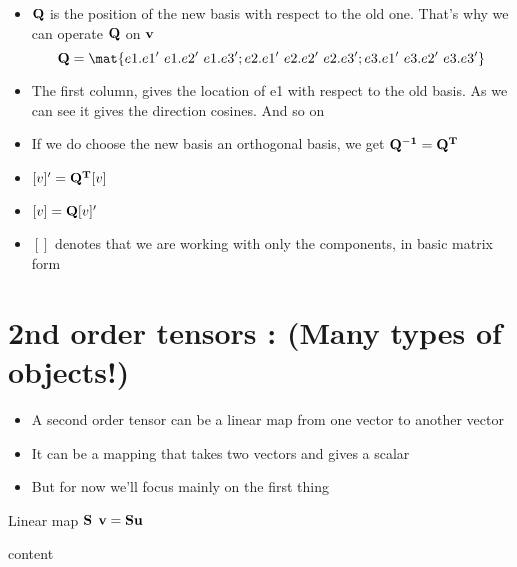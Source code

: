 	\begin{frame}
		\begin{itemize}
			\item $\mathbf{Q}$ is the position of the new basis with respect to the old one. That's why we can operate $\mathbf{Q}$ on $\mathbf{v}$
			\begin{equation}
				\ve{Q} = \mat{e1.e1'~e1.e2'~e1.e3';e2.e1'~e2.e2'~e2.e3';e3.e1'~e3.e2'~e3.e3'}
			\end{equation}
			\item The first column, gives the location of e1 with respect to the old basis. As we can see it gives the direction cosines. And so on
			\item If we do choose the new basis an orthogonal basis, we get $\mathbf{Q^{-1} = Q^T}$
			\item $[v]' = \mathbf{Q^T}[v]$
			\item $[v] = \mathbf{Q}[v]'$
			\item $[]$ denotes that we are working with only the components, in basic matrix form
		\end{itemize}
	\end{frame}

\section{2nd order tensors : (Many types of objects!)}

	\begin{frame}
		\begin{itemize}
			\item A second order tensor can be a linear map from one vector to another vector
			\item It can be a mapping that takes two vectors and gives a scalar			
			\item But for now we'll focus mainly on the first thing
		\end{itemize}
	
		\begin{block}{Linear map $\mathbf{S}$}
			$\mathbf{v = Su}$
		\end{block}
	\end{frame}

	\begin{frame}
		content
	\end{frame}